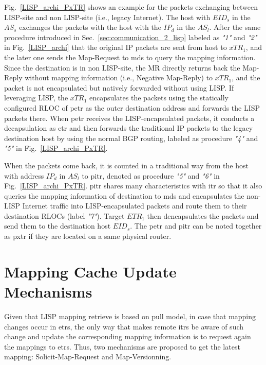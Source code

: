Fig.~\ref{LISP_archi_PxTR} shows an example for the packets exchanging between LISP-site and non LISP-site (i.e., legacy Internet). The host with $EID_s$ in the $AS_s$ exchanges the packets with the host with the $IP_d$ in the $AS_l$. After the same procedure introduced in Sec.~\ref{sec:communication_2_lisp} labeled as \emph{"1"} and \emph{"2"} in Fig.~\ref{LISP_archi} that the original IP packets are sent from host to $xTR_1$, and the later one sends the Map-Request to \acrshort{mds} to query the mapping information. Since the destination is in non LISP-site, the MR directly returns back the Map-Reply without mapping information (i.e., Negative Map-Reply) to $xTR_1$, and the packet is not encapsulated but natively forwarded without using LISP. If leveraging LISP, the $xTR_1$ encapsulates the packets using the statically configured RLOC of \acrshort{petr} as the outer destination address and forwards the LISP packets there. When \acrshort{petr} receives the LISP-encapsulated packets, it conducts a decapsulation as \acrshort{etr} and then forwards the traditional IP packets to the legacy destination host by using the normal BGP routing, labeled as procedure \emph{"4"} and \emph{"5"} in Fig.~\ref{LISP_archi_PxTR}. 

When the packets come back, it is counted in a traditional way from the host with address $IP_d$ in $AS_l$ to \acrshort{pitr}, denoted as procedure \emph{"5"} and \emph{"6"} in Fig.~\ref{LISP_archi_PxTR}. \acrshort{pitr} shares many characteristics with \acrshort{itr} so that it also queries the mapping information of destination to \acrshort{mds} and encapsulates the non-LISP Internet traffic into LISP-encapsulated packets and route them to their destination RLOCs (label \emph{"7"}). Target $ETR_1$ then dencapsulates the packets and send them to the destination host $EID_s$. The \acrshort{petr} and \acrshort{pitr} can be noted together as \acrshort{pxtr} if they are located on a same physical router.



\section{Mapping Cache Update Mechanisms}
\label{sec:updateMechanisms}
Given that LISP mapping retrieve is based on pull model, in case that mapping changes occur in \acrshort{etr}s, the only way that makes remote \acrshort{itr}s be aware of such change and update the corresponding mapping information is to request again the mappings to \acrshort{etr}s. Thus, two mechanisms are proposed to get the latest mapping: Solicit-Map-Request and Map-Versionning.


